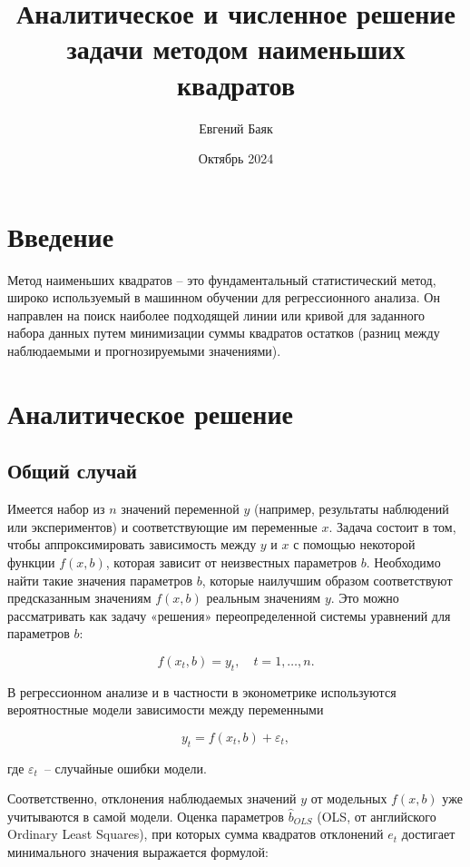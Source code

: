 \documentclass[11pt,a4paper]{article}
\title{Аналитическое и численное решение задачи методом наименьших квадратов}
\author{Евгений Баяк}
\date{Октябрь 2024}
\begin{document}
\maketitle

\section*{Введение}
Метод наименьших квадратов -- это фундаментальный статистический метод, широко используемый в машинном обучении для регрессионного анализа. Он направлен на поиск наиболее подходящей линии или кривой для заданного набора данных путем минимизации суммы квадратов остатков (разниц между наблюдаемыми и прогнозируемыми значениями).

\section{Аналитическое решение}

\subsection{Общий случай}
Имеется набор из $n$ значений переменной $y$ (например, результаты наблюдений или экспериментов) и соответствующие им переменные $x$. Задача состоит в том, чтобы аппроксимировать зависимость между $y$ и $x$ с помощью некоторой функции $f(x, b)$, которая зависит от неизвестных параметров $b$. Необходимо найти такие значения параметров $b$, которые наилучшим образом соответствуют предсказанным значениям $f(x, b)$ реальным значениям $y$. Это можно рассматривать как задачу «решения» переопределенной системы уравнений для параметров $b$:

\begin{equation}
f(x_t,b)=y_t, \quad t=1, \ldots, n.
\end{equation}

В регрессионном анализе и в частности в эконометрике используются вероятностные модели зависимости между переменными

\begin{equation}
y_t=f(x_t,b)+\varepsilon_t,
\end{equation}

где $\varepsilon_t$~-- случайные ошибки модели.

Соответственно, отклонения наблюдаемых значений $y$ от модельных $f(x,b)$ уже учитываются в самой модели. Оценка параметров $\hat b_{OLS}$ (OLS, от английского Ordinary Least Squares), при которых сумма квадратов отклонений $e_t$ достигает минимального значения выражается формулой:
\end{document}
